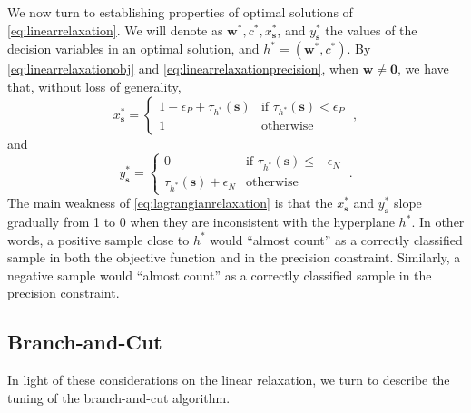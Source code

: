 \documentclass[11pt]{article}
\theoremstyle{definition}
\newcommand{\vect}[1]{\mathbf{#1}}
\newcommand{\sv}[1]{_{\vect{#1}}}
\begin{document}
We now turn to establishing properties of optimal solutions of
\eqref{eq:linearrelaxation}.
We will denote as $\vect{w}^*, c^*, x\sv{s}^*$, and $y\sv{s}^*$ the 
values of the decision variables in an optimal solution,
and $h^* = (\vect{w}^*, c^*)$.
By \eqref{eq:linearrelaxationobj} and \eqref{eq:linearrelaxationprecision},
when $\vect{w} \neq \vect{0}$,
we have that, without loss of generality, 
$$x\sv{s}^* = \begin{cases}
1 - \epsilon_P + \tau_{h^*}(\vect{s}) & 
\text{if } \tau_{h^*}(\vect{s}) < \epsilon_P \\
1 & \text{otherwise}
\end{cases}\;,$$
and
$$y\sv{s}^* = \begin{cases}
0 & \text{if } \tau_{h^*}(\vect{s}) \leq - \epsilon_N \\
\tau_{h^*} (\vect{s}) + \epsilon_N & \text{otherwise}
\end{cases}\;.$$
The main weakness of \eqref{eq:lagrangianrelaxation} is that the 
$x\sv{s}^*$ and $y\sv{s}^*$ slope gradually from 1 to 0 when 
they are inconsistent with the hyperplane $h^*$.
In other words, a positive sample close to $h^*$ would ``almost count''
as a correctly classified sample in both the objective function and in
the precision constraint. 
Similarly, a negative sample would ``almost count'' as a correctly 
classified sample in the precision constraint.

\subsection{Branch-and-Cut}
\label{sec:branchcut}
In light of these considerations on the linear relaxation,
we turn to describe the tuning of the branch-and-cut algorithm.
\end{document}
